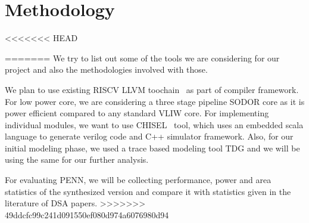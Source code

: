 \section{Methodology }\label{sec:meth}
<<<<<<< HEAD

=======
We try to list out some of the tools we are considering for our project and also the methodologies involved with those.

We plan to use existing RISCV LLVM toochain~\cite{nguyenlinux} as part of compiler framework. 
For low power core, we are considering a three stage pipeline SODOR core as it is power efficient compared to any standard VLIW core. 
For implementing individual modules, we want to use CHISEL~\cite{chisel2012} tool, which uses an embedded scala language to generate verilog code and C++ simulator
framework. Also, for our initial modeling phase, we used a trace based modeling tool TDG and we will be using the same for our further analysis.   

For evaluating PENN, we will be collecting performance, power and area statistics of the synthesized version and compare it with statistics 
given in the literature of DSA papers. 
>>>>>>> 49ddcfc99c241d091550ef080d974a6076980d94
